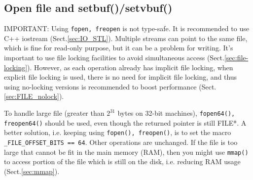 \subsection{Open file and setbuf()/setvbuf()}

IMPORTANT: Using \verb!fopen, freopen! is not type-safe. It is recommended to
use C++ iostream (Sect.\ref{sec:IO_STL}). Multiple streams can point to the same
file, which is fine for read-only purpose, but it can be a problem for writing.
It's important to use file locking facilities to avoid simultaneous access
(Sect.\ref{sec:file-locking}). However, as each operation already has implicit
file locking, when explicit file locking is used, there is no need for implicit
file locking, and thus using no-locking versions is recommended to boost
performance (Sect.\ref{sec:FILE_nolock}).

To handle large file (greater than $2^{31}$ bytes on 32-bit machines),
\verb!fopen64(), freopen64()! should be used, even though the returned pointer
is still FILE*. A better solution, i.e. keeping using \verb!fopen(), freopen()!,
is to set the macro \verb!_FILE_OFFSET_BITS == 64!. Other operations are
unchanged. If the file is too large that cannot be fit in the main memory (RAM),
then you might use \verb!mmap()! to access portion of the file which is still on
the disk, i.e. reducing RAM usage (Sect.\ref{sec:mmap}).

